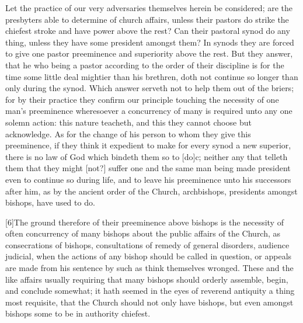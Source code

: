 Let the practice of our very adversaries themselves herein be considered; are the presbyters able to determine of church affairs, unless their pastors do strike the chiefest stroke and have power above the rest? Can their pastoral synod do any thing, unless they have some president amongst them? In synods they are forced to give one pastor preeminence and superiority above the rest. But they answer, that he who being a pastor according to the order of their discipline is for the time some little deal mightier than his brethren, doth not continue so longer than only during the synod. Which answer serveth not to help them out of the briers; for by their practice they confirm our principle touching the necessity of one man’s preeminence wheresoever a concurrency of many is required unto any one solemn action: this nature teacheth, and this they cannot choose but acknowledge. As for the change of his person to whom they give this preeminence, if they think it expedient to make for every synod a new superior,  there is no law of God which bindeth them so to [do]c;
 neither any that telleth them that they might [not?] suffer one and the same man being made president even to continue so during life, and to leave his preeminence unto his successors after him, as by the ancient order of the Church, archbishops, presidents amongst bishops, have used to do.

[6]The ground therefore of their preeminence above bishops is the necessity of often concurrency of many bishops about the public affairs of the Church, as consecrations of bishops, consultations of remedy of general disorders, audience judicial, when the actions of any bishop should be called in question, or appeals are made from his sentence by such as think themselves wronged. These and the like affairs usually requiring that many bishops should orderly assemble, begin, and conclude somewhat; it hath seemed in the eyes of reverend antiquity a thing most requisite, that the Church should not only have bishops, but even amongst bishops some to be in authority chiefest.

